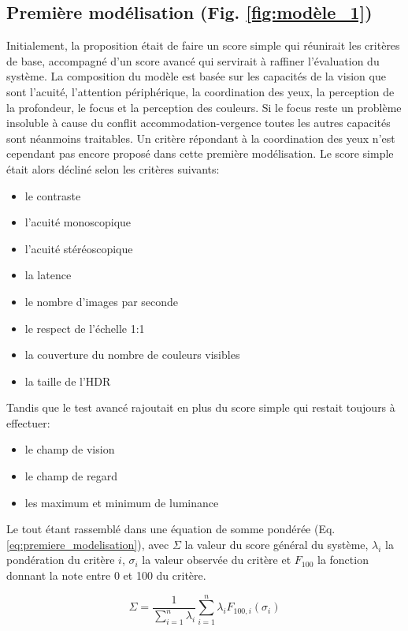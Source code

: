 	\subsection{Première modélisation (Fig. \ref{fig:modèle_1})}
	\par Initialement, la proposition était de faire un score simple qui réunirait les critères de base, accompagné d'un score avancé qui servirait à raffiner l'évaluation du système. La composition du modèle est basée sur les capacités de la vision que sont l'acuité, l'attention périphérique, la coordination des yeux, la perception de la profondeur, le focus et la perception des couleurs. Si le focus reste un problème insoluble à cause du conflit accommodation-vergence toutes les autres capacités sont néanmoins traitables. Un critère répondant à la coordination des yeux n'est cependant pas encore proposé dans cette première modélisation. Le score simple était alors décliné selon les critères suivants:
	\begin{itemize}
		\item le contraste
		\item l'acuité monoscopique
		\item l'acuité stéréoscopique
		\item la latence
		\item le nombre d'images par seconde
		\item le respect de l'échelle 1:1
		\item la couverture du nombre de couleurs visibles
		\item la taille de l'HDR
	\end{itemize}
	Tandis que le test avancé rajoutait en plus du score simple qui restait toujours à effectuer:
	\begin{itemize}
		\item le champ de vision
		\item le champ de regard
		\item les maximum et minimum de luminance
	\end{itemize}
	Le tout étant rassemblé dans une équation de somme pondérée (Eq. \ref{eq:premiere_modelisation}), avec $\Sigma$ la valeur du score général du système, $\lambda_i$ la pondération du critère $i$, $\sigma_i$ la valeur observée du critère et $F_{100}$ la fonction donnant la note entre 0 et 100 du critère. 
	
	\begin{equation}
		\Sigma = \frac{1}{\sum_{i = 1}^{n} \lambda_i} \sum_{i = 1}^{n} \lambda_i F_{100,i}(\sigma_i)
		\label{eq:premiere_modelisation}
	\end{equation}
	
